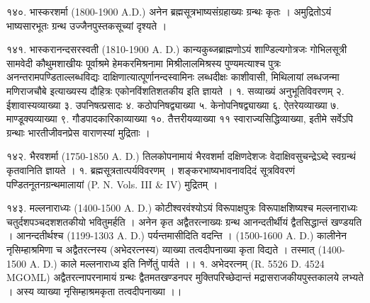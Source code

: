 १४०. भास्करशर्मा (1800-1900 A.D.)
अनेन ब्रह्मसूत्रभाष्यसंग्रहाख्यः ग्रन्थः कृतः । अमुद्रितोऽयं भाष्यसारभूतः ग्रन्थ उज्जैनपुस्तकसूच्यां दृश्यते ।

१४१. भास्करानन्दसरस्वती (1810-1900 A. D.)
कान्यकुब्जब्राह्मणोऽयं शाण्डिल्यगोत्रजः गोभिलसूत्री सामवेदी कौथुमशाखीयः पूर्वाश्रमे हेमकरमिश्रनामा मिश्रीलालमिश्रस्य पुण्यमत्याश्च पुत्रः अनन्तरामपण्डिताल्लब्धविद्यः दाक्षिणात्यात्पूर्णानन्दस्वामिनः लब्धदीक्षः काशीवासी, मिथिलायां लब्धजन्मा मणिराजचौबे इत्याख्यस्य दौहित्रः एकोनविंशतिशतकीय इति ज्ञायते ।
१. सव्याख्यं अनुभूतिविवरणम् २. ईशावास्यव्याख्या ३. उपनिषत्प्रसादः ४. कठोपनिषद्व्याख्या ५. केनोपनिषद्व्याख्या ६. ऐतरेयव्याख्या ७. माण्डूक्यव्याख्या ९. गौडपादकारिकाव्याख्या १०. तैत्तरीयव्याख्या ११ स्वाराज्यसिद्धिव्याख्या, इतीमे सर्वेऽपि ग्रन्थाः भारतीजीवनप्रेस वाराणस्यां मुद्रिताः ।

१४२. भैरवशर्मा (1750-1850 A. D.) 
तिलकोपनामायं भैरवशर्मा दक्षिणदेशजः वेदाक्षिवसुचन्द्रेऽब्दे स्वग्रन्थं कृतवानिति ज्ञायते ।
१. ब्रह्मसूत्रतात्पर्यविवरणम् । शङ्करभाष्यभावनावदिदं सूत्रविवरणं पण्डितनूतनग्रन्थमालायां (P. N. Vols. III & IV) मुद्रितम् ।

१४३. मल्लनाराध्यः (1400-1500 A. D.)
कोटीश्वरवंश्योऽयं विरूपाक्षपुत्रः विरूपाक्षशिष्यश्च मल्लनाराध्यः चतुर्दशपञ्चदशशतकीयो भवितुमर्हति । अनेन कृत अद्वैतरत्नाख्यः ग्रन्थ आनन्दतीर्थीयं द्वैतसिद्धान्तं खण्डयति । आनन्दतीर्थश्च (1199-1303 A. D.) पर्यन्तमासीदिति वदन्ति । (1500-1600 A. D.) कालीनेन नृसिम्हाश्रमिणा च अद्वैतरत्नस्य (अभेदरत्नस्य) व्याख्या तत्वदीपनाख्या कृता विद्यते । तस्मात् (1400-1500 A. D.) काले मल्लनाराध्य इति निर्णेतुं पार्यते ।।
१. अभेदरत्नम् (R. 5526 D. 4524 MGOML)
अद्वैतरत्नापरनामायं ग्रन्थः द्वैतमतखण्डनपर मुक्तिपरिच्छेदान्तं मद्रासराजकीयपुस्तकालये लभ्यते । अस्य व्याख्या नृसिम्हाश्रमकृता तत्वदीपनाख्या ।।

